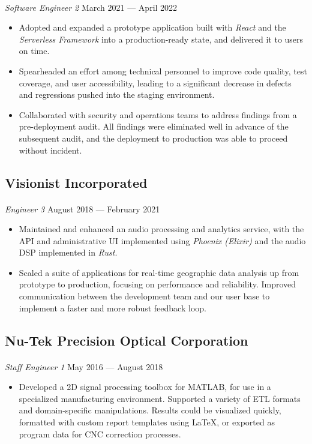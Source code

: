\documentclass[10pt]{article}
\begin{document}
\paragraph{}
\textit{Software Engineer 2} \hfill March 2021 --- April 2022
\begin{itemize}
  \item Adopted and expanded a prototype application built with \textit{React}
    and the \textit{Serverless Framework} into a production-ready state, and
    delivered it to users on time.
  \item Spearheaded an effort among technical personnel to improve code
    quality, test coverage, and user accessibility, leading to a significant
    decrease in defects and regressions pushed into the staging environment.
  \item Collaborated with security and operations teams to address findings
    from a pre-deployment audit. All findings were eliminated well in advance
    of the subsequent audit, and the deployment to production was able to
    proceed without incident.
\end{itemize}

\subsection*{Visionist Incorporated}
\paragraph{}
\textit{Engineer 3} \hfill August 2018 --- February 2021

\begin{itemize}
  \item Maintained and enhanced an audio processing and analytics service,
    with the API and administrative UI implemented using \textit{Phoenix (Elixir)}
    and the audio DSP implemented in \textit{Rust}.
  \item Scaled a suite of applications for real-time geographic data
    analysis up from prototype to production, focusing on performance and
    reliability. Improved communication between the development team and our
    user base to implement a faster and more robust feedback loop.
\end{itemize}

\subsection*{Nu-Tek Precision Optical Corporation}
\paragraph{}
\textit{Staff Engineer 1} \hfill May 2016 --- August 2018
\begin{itemize}
  \item Developed a 2D signal processing toolbox for MATLAB, for use in a specialized
    manufacturing environment. Supported a variety of ETL formats and domain-specific
    manipulations. Results could be visualized quickly, formatted with custom report
    templates using \LaTeX, or exported as program data for CNC correction processes.
\end{itemize}
\end{document}
